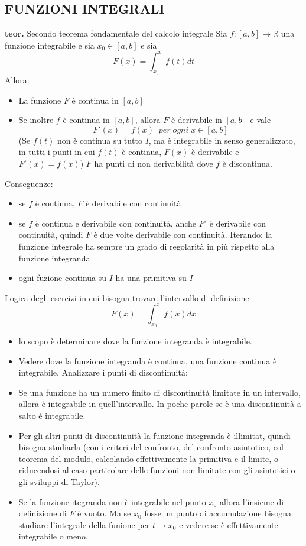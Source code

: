 \documentclass[a4paper, 9pt]{report}
\begin{document}
\subsection*{FUNZIONI INTEGRALI}
\textbf{teor.} Secondo teorema fondamentale del calcolo integrale \newline
Sia $f: [a,b] \rightarrow \mathbb{R}$ una funzione integrabile e sia $x_0 \in [a,b]$ e sia 
\[
    F(x) = \int_{x_0}^{x} f(t) dt
\]
Allora:
\begin{itemize}
    \item La funzione $F$ è continua in $[a,b]$
    \item Se inoltre $f$ è continua in $[a,b]$, allora $F$ è derivabile in $[a,b]$ e vale
    \[
        F'(x) = f(x) \;\; per \; ogni \; x \in[a,b]
    \]
    (Se $f(t)$ non è continua su tutto $I$, ma è integrabile in senso generalizzato, in tutti i punti in cui $f(t)$ è continua, $F(x)$ è derivabile e $F'(x) = f(x)$)\newline
    $F$ ha punti di non derivabilità dove $f$ è discontinua.
\end{itemize}
Conseguenze:
\begin{itemize}
    \item se $f$ è continua, $F$ è derivabile con continuità
    \item se $f$ è continua e derivabile con continuità, anche $F'$ è derivabile con continuità, quindi $F$ è due volte derivabile con continuità. Iterando: la funzione integrale ha sempre un grado di regolarità in più rispetto alla funzione integranda
    \item ogni fuzione continua su $I$ ha una primitiva su $I$
\end{itemize}
Logica degli esercizi in cui bisogna trovare l'intervallo di definizione:
\[
    F(x) = \int_{x_0}^{x}f(x)dx
\]
\begin{itemize}
    \item lo scopo è determinare dove la funzione integranda è integrabile.
    \item Vedere dove la funzione integranda è continua, una funzione continua è integrabile. Analizzare i punti di discontinuità:
    \item Se una funzione ha un numero finito di discontinuità limitate in un intervallo, allora è integrabile in quell'intervallo. In poche parole se è una discontinuità a salto è integrabile.
    \item Per gli altri punti di discontinuità la funzione integranda è illimitat, quindi bisogna studiarla (con i criteri del confronto, del confronto asintotico, col teorema del modulo, calcolando effettivamente la primitiva e il limite, o riducendosi al caso particolare delle funzioni non limitate con gli asintotici o gli sviluppi di Taylor).
    \item Se la funzione itegranda non è integrabile nel punto $x_0$ allora l'insieme di definizione di $F$ è vuoto. Ma se $x_0$ fosse un punto di accumulazione bisogna studiare l'integrale della funione per $t \rightarrow x_0$ e vedere se è effettivamente integrabile o meno.
\end{itemize}
\end{document}
